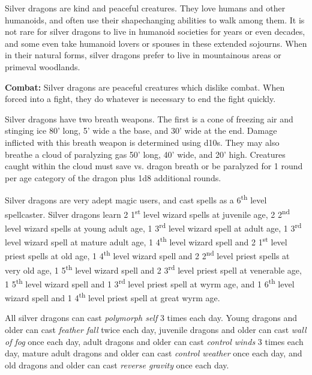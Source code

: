 \begin{multicols}{2}
Silver dragons are kind and peaceful creatures. They love humans and other humanoids, and often use their shapechanging abilities to walk among them. It is not rare for silver dragons to live in humanoid societies for years or even decades, and some even take humanoid lovers or spouses in these extended sojourns. When in their natural forms, silver dragons prefer to live in mountainous areas or primeval woodlands.

\textbf{Combat:} Silver dragons are peaceful creatures which dislike combat. When forced into a fight, they do whatever is necessary to end the fight quickly.

Silver dragons have two breath weapons. The first is a cone of freezing air and stinging ice 80' long, 5' wide a the base, and 30' wide at the end. Damage inflicted with this breath weapon is determined using d10s. They may also breathe a cloud of paralyzing gas 50' long, 40' wide, and 20' high. Creatures caught within the cloud must save vs. dragon breath or be paralyzed for 1 round per age category of the dragon plus 1d8 additional rounds.

Silver dragons are very adept magic users, and cast spells as a 6\textsuperscript{th} level spellcaster. Silver dragons learn 2 1\textsuperscript{st} level wizard spells at juvenile age, 2 2\textsuperscript{nd} level wizard spells at young adult age, 1 3\textsuperscript{rd} level wizard spell at adult age, 1 3\textsuperscript{rd} level wizard spell at mature adult age, 1 4\textsuperscript{th} level wizard spell and 2 1\textsuperscript{st} level priest spells at old age, 1 4\textsuperscript{th} level wizard spell and 2 2\textsuperscript{nd} level priest spells at very old age, 1 5\textsuperscript{th} level wizard spell and 2 3\textsuperscript{rd} level priest spell at venerable age, 1 5\textsuperscript{th} level wizard spell and 1 3\textsuperscript{rd} level priest spell at wyrm age, and 1 6\textsuperscript{th} level wizard spell and 1 4\textsuperscript{th} level priest spell at great wyrm age.

All silver dragons can cast \textit{polymorph self} 3 times each day. Young dragons and older can cast \textit{feather fall} twice each day, juvenile dragons and older can cast \textit{wall of fog} once each day, adult dragons and older can cast \textit{control winds} 3 times each day, mature adult dragons and older can cast \textit{control weather} once each day, and old dragons and older can cast \textit{reverse gravity} once each day.

\noindent \begin{minipage}{\columnwidth}


\end{minipage}
\end{multicols}
